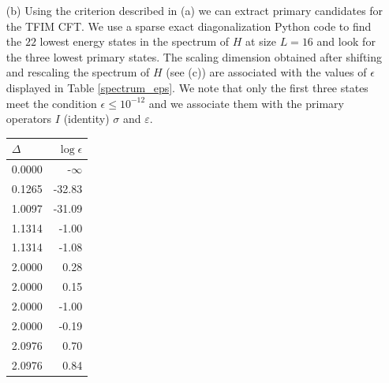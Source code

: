 \documentclass[10pt, a4paper]{article}
\begin{document}
{\begin{enumerate}
  In the finite size spectrum of $H$, the approximate primaries can be found by numerically computing the norm $\epsilon^{(n)}_\varphi \equiv |\Gamma_{\varphi} O_n\ket{\varphi}|$. This norm is zero in the limit $L\to \infty$ iff we have a primary state. For finite $L$, we relax the zero norm condition to a small norm condition. More precisely, we introduce a threshold $\epsilon_{\rm max}$ and declare an eigenstate of $H$ "primary candidate" iff $\epsilon \equiv \epsilon^{(1)}_\varphi + \epsilon^{(2)}_\varphi \leq \epsilon_{\rm max}$. 
  \item[(b)] Using the criterion described in (a) we can extract primary candidates for the TFIM CFT. We use a sparse exact diagonalization Python code to find the $22$ lowest energy states in the spectrum of $H$ at size $L = 16$ and look for the three lowest primary states. The scaling dimension obtained after shifting and rescaling the spectrum of $H$ (see (c)) are associated with the values of $\epsilon$ displayed in Table \ref{spectrum_eps}. We note that only the first three states meet the condition $\epsilon \leq 10^{-12}$ and we associate them with the primary operators $I$ (identity) $\sigma$ and $\varepsilon$. 
  \begin{table}
    \centering
        \begin{minipage}{.5\linewidth}
          \flushright
          \begin{tabular}{lr}
            \toprule
            $\Delta$ & $\log \epsilon$ \\
            \midrule
            0.0000 & -$\infty$\\
            0.1265 & -32.83 \\
            1.0097 & -31.09 \\
            1.1314 & -1.00 \\
            1.1314 & -1.08 \\
            2.0000 & 0.28 \\
            2.0000 & 0.15 \\
            2.0000 & -1.00 \\
            2.0000 & -0.19 \\
            2.0976 & 0.70 \\
            2.0976 & 0.84 \\
            \bottomrule
            \end{tabular}
        \end{minipage}%
        \begin{minipage}{.5\linewidth}
          \flushleft

\end{minipage}
\end{table}
\end{enumerate}}
\end{document}
